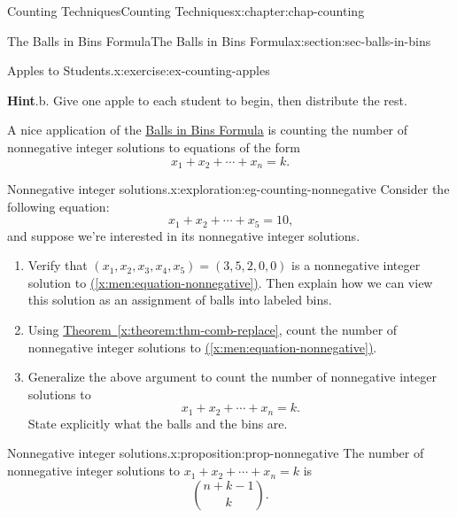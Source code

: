 \documentclass[oneside,10pt,]{book}
\newcommand{\blocktitlefont}{\relax}
\newcommand{\xreffont}{\relax}
\numberwithin{equation}{section}
\begin{document}
\begin{chapterptx}{Counting Techniques}{}{Counting Techniques}{}{}{x:chapter:chap-counting}
\begin{sectionptx}{The Balls in Bins Formula}{}{The Balls in Bins Formula}{}{}{x:section:sec-balls-in-bins}
\begin{inlineexercise}{Apples to Students.}{x:exercise:ex-counting-apples}
\begin{enumerate}[label=(\alph*)]
\end{enumerate}
%
\par\smallskip%
\noindent\textbf{\blocktitlefont Hint}.\hypertarget{g:hint:id527143}{}\quad{}b. Give one apple to each student to begin, then distribute the rest.%
\end{inlineexercise}%
A nice application of the \hyperref[x:theorem:thm-comb-replace]{Balls in Bins Formula} is counting the number of nonnegative integer solutions to equations of the form%
\begin{equation*}
x_1 + x_2 + \cdots + x_n = k\text{.}
\end{equation*}
%
\begin{exploration}{Nonnegative integer solutions.}{x:exploration:eg-counting-nonnegative}%
Consider the following equation:%
\begin{equation}
x_1 + x_2 + \cdots + x_5 = 10\text{,}\label{x:men:equation-nonnegative}
\end{equation}
and suppose we're interested in its nonnegative integer solutions.%
\begin{enumerate}[font=\bfseries,label=(\alph*),ref=\alph*]
\item{}Verify that \((x_1,x_2,x_3,x_4,x_5) = (3,5,2,0,0)\) is a nonnegative integer solution to \hyperref[x:men:equation-nonnegative]{({\xreffont\ref{x:men:equation-nonnegative}})}. Then explain how we can view this solution as an assignment of balls into labeled bins.%
\item{}Using \hyperref[x:theorem:thm-comb-replace]{Theorem~{\xreffont\ref{x:theorem:thm-comb-replace}}}, count the number of nonnegative integer solutions to \hyperref[x:men:equation-nonnegative]{({\xreffont\ref{x:men:equation-nonnegative}})}.%
\item{}Generalize the above argument to count the number of nonnegative integer solutions to%
\begin{equation*}
x_1 + x_2 + \cdots + x_n = k\text{.}
\end{equation*}
State explicitly what the balls and the bins are.%
\end{enumerate}
\end{exploration}%
\begin{proposition}{Nonnegative integer solutions.}{}{x:proposition:prop-nonnegative}%
The number of nonnegative integer solutions to \(x_1 + x_2 + \cdots + x_n = k\) is%
\begin{equation*}
\displaystyle\binom{n+k-1}{k}\text{.}
\end{equation*}
%
\end{proposition}

\end{sectionptx}
\end{chapterptx}
\end{document}
